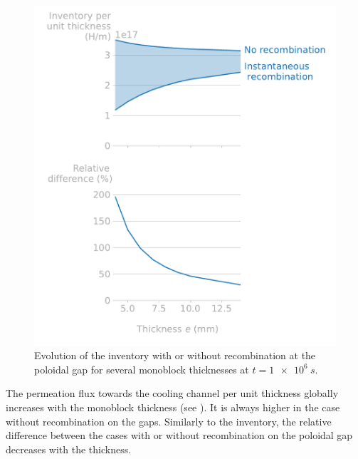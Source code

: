 \begin{figure} [h]
    \centering
    \includegraphics[width=\linewidth]{Figures/Chapter3/monoblocks/3D_monoblocks/inventory_vs_thickness.pdf}
    \caption{Evolution of the inventory with or without recombination at the poloidal gap for several monoblock thicknesses at $t=\SI{1e6}{s}$.}
\end{figure}

The permeation flux towards the cooling channel per unit thickness globally increases with the monoblock thickness (see ).
It is always higher in the case without recombination on the gaps.
Similarly to the inventory, the relative difference between the cases with or without recombination on the poloidal gap decreases with the thickness.

